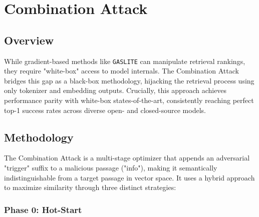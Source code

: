 \documentclass[a4paper, sigconf]{acmart}
\begin{document}
\appendix
\twocolumn

\section{Combination Attack}


\subsection{Overview}
%

While gradient-based methods like \texttt{GASLITE} \cite{bentov2024} can manipulate retrieval rankings, they require "white-box" access to model internals. 
The Combination Attack bridges this gap as a black-box methodology, hijacking the retrieval process using only tokenizer and embedding outputs. 
Crucially, this approach achieves performance parity with white-box states-of-the-art, consistently reaching perfect top-1 success rates across diverse open- and closed-source models.


\subsection{Methodology}

The Combination Attack is a multi-stage optimizer that appends an adversarial "trigger" suffix to a malicious passage ("info"), making it semantically indistinguishable from a target passage in vector space. It uses a hybrid approach to maximize similarity through three distinct strategies:

\subsubsection*{Phase 0: Hot-Start}
\end{document}

